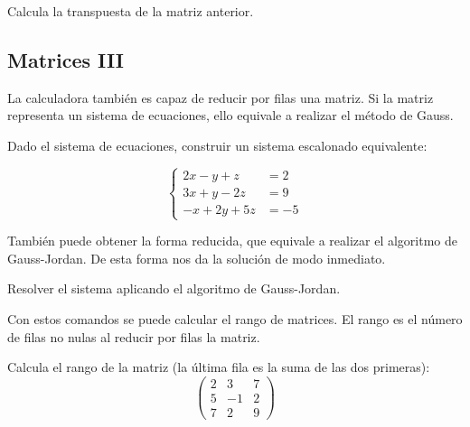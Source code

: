 \documentclass[12pt]{article}
\newenvironment{capitulo}{\begin{tcolorbox}[colback=blue!5!white,colframe=red!75!black]}{\end{tcolorbox}\bigskip}
\newenvironment{ejer}{\begin{tcolorbox}[center title, 
fonttitle=\sffamily\bfseries,colback=blue!5,colframe=orange]}{\end{tcolorbox}}
\begin{document}
\begin{ejer}

Calcula la transpuesta de la matriz anterior.

\end{ejer}


\newpage

\begin{capitulo}
\section*{Matrices III}
\end{capitulo}


La calculadora también es capaz de reducir por filas una matriz. Si la matriz representa un sistema de ecuaciones, ello equivale a realizar el método de Gauss. 




\begin{ejer}

Dado el sistema de ecuaciones, construir un sistema escalonado equivalente:

\[
\begin{cases}
2x-y+z &= 2\\
3x+y-2z & = 9\\
-x+2y+5z& = -5
\end{cases}
\]


\end{ejer}

También puede obtener la forma reducida, que equivale a realizar el algoritmo de Gauss-Jordan. De esta forma nos da la solución de modo inmediato.


\begin{ejer}

Resolver el sistema aplicando el algoritmo de Gauss-Jordan.


\end{ejer}



Con estos comandos se puede calcular el rango de matrices. El rango es el número de filas no nulas al reducir por filas la matriz.

\begin{ejer}

Calcula el rango de la matriz (la última fila es la suma de las dos primeras):
\[
\begin{pmatrix}
2 & 3 & 7\\
5 & -1 & 2 \\
7 & 2 & 9
\end{pmatrix}
\]



\end{ejer}
\end{document}
